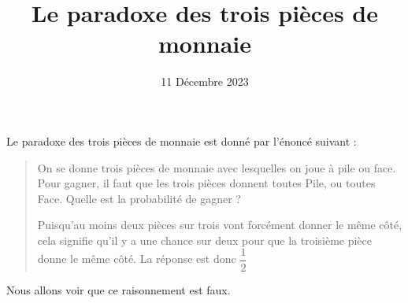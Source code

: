 \documentclass{exam}
\title{Le paradoxe des trois pièces de monnaie}
\date{11 Décembre 2023}
\begin{document}
\begin{questions}
\question Le paradoxe des trois pièces de monnaie est donné par l'énoncé suivant :
\begin{quote}
\og On se donne trois pièces de monnaie avec lesquelles on joue à pile ou face. Pour gagner, il faut que les trois pièces donnent toutes Pile, ou toutes Face. Quelle est la probabilité de gagner ?

Puisqu'au moins deux pièces sur trois vont forcément donner le même côté, cela signifie qu'il y a une chance sur deux pour que la troisième pièce donne le même côté. La réponse est donc $\dfrac{1}{2}$\fg
\end{quote} 
Nous allons voir que ce raisonnement est faux.
\end{questions}
\vspace{0.75cm}
\end{document}
